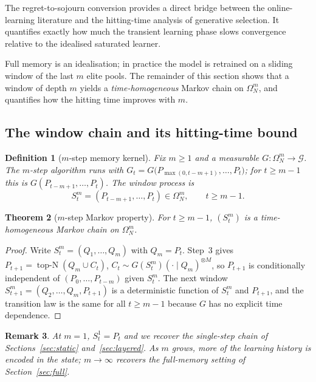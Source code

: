 \documentclass[11pt,a4paper]{article}
\newtheorem{theorem}{Theorem}[section]
\newtheorem{definition}[theorem]{Definition}
\newtheorem{remark}[theorem]{Remark}
\newcommand{\G}{\mathcal{G}}
\newcommand{\Omn}{\Omega_N}
\DeclareMathOperator{\topN}{top\text{-}N}
\begin{document}
The regret-to-sojourn conversion provides a direct bridge between the
online-learning literature and the hitting-time analysis of generative
selection.  It quantifies exactly how much the transient learning phase
slows convergence relative to the idealised saturated learner.

Full memory is an idealisation; in practice the model is retrained on a
sliding window of the last $m$ elite pools.  The remainder of this section
shows that a window of depth $m$ yields a \emph{time-homogeneous} Markov
chain on $\Omn^m$, and quantifies how the hitting time improves with $m$.

\subsection{The window chain and its hitting-time bound}

\begin{definition}[$m$-step memory kernel]\label{def:m-kernel}
  Fix $m\ge1$ and a measurable $G\colon\Omn^m\to\G$.  The \emph{$m$-step}
  algorithm runs  with
  $G_t=G\bigl(P_{\max(0,t-m+1)},\dots,P_t\bigr)$; for $t\ge m-1$ this is
  $G(P_{t-m+1},\dots,P_t)$.  The \emph{window process} is
  \[
    S_t^m=(P_{t-m+1},\dots,P_t)\in\Omn^m,\qquad t\ge m-1.
  \]
\end{definition}

\begin{theorem}[$m$-step Markov property]\label{thm:m-markov}
  For $t\ge m-1$, $(S_t^m)$ is a time-homogeneous Markov chain on
  $\Omn^m$.
\end{theorem}

\begin{proof}
  Write $S_t^m=(Q_1,\dots,Q_m)$ with $Q_m=P_t$.  Step~3 gives
  $P_{t+1}=\topN(Q_m\cup C_t)$, $C_t\sim G(S_t^m)(\cdot\mid Q_m)^{\otimes
  M}$, so $P_{t+1}$ is conditionally independent of
  $(P_0,\dots,P_{t-m})$ given $S_t^m$.  The next window
  $S_{t+1}^m=(Q_2,\dots,Q_m,P_{t+1})$ is a deterministic function of
  $S_t^m$ and $P_{t+1}$, and the transition law is the same for all
  $t\ge m-1$ because $G$ has no explicit time dependence.
\end{proof}

\begin{remark}
  At $m=1$, $S_t^1=P_t$ and we recover the single-step chain of
  Sections~\ref{sec:static} and~\ref{sec:layered}.  As $m$ grows, more of
  the learning history is encoded in the state; $m\to\infty$ recovers the
  full-memory setting of Section~\ref{sec:full}.
\end{remark}
\end{document}
